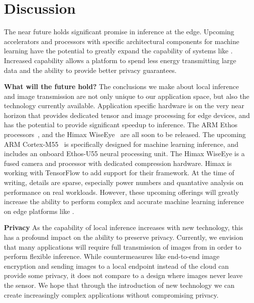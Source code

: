 \section{Discussion}
The near future holds significant promise in inference at the edge. Upcoming accelerators and processors with specific architectural components for machine learning have the potential to greatly expand the capability of systems like \name. Increased capability allows a platform to spend less energy transmitting large data and the ability to provide better privacy guarantees.

\textbf{What will the future hold?}
The conclusions we make about local inference and image transmission are not only unique to our application space, but also the technology currently available. Application specific hardware is on the very near horizon that provides dedicated tensor and image processing for edge devices, and has the potential to provide significant speedup to inference. 
The ARM Ethos processors~\cite{armethos}, and the Himax WiseEye~\cite{himaxwiseeye} are all soon to be released. 
The upcoming ARM Cortex-M55~\cite{armm55} is specifically designed for machine learning inference, and includes an onboard Ethos-U55 neural processing unit. 
The Himax WiseEye is a fused camera and processor with dedicated compression hardware. 
Himax is working with TensorFlow to add support for their framework.
At the time of writing, details are sparse, especially power numbers and quantative analysis on performance on real workloads.
However, these upcoming offerings will greatly increase the ability to perform complex and accurate machine learning inference on edge platforms like \name.

\textbf{Privacy}
As the capability of local inference increases with new technology, this has a profound impact on the ability to preserve privacy. Currently, we envision that many applications will require full transmission of images from \name in order to perform flexible inference. While countermeasures like end-to-end image encryption and sending images to a local endpoint instead of the cloud can provide some privacy, it does not compare to a design where images never leave the sensor. We hope that through the introduction of new technology we can create increasingly complex applications without compromising privacy.


